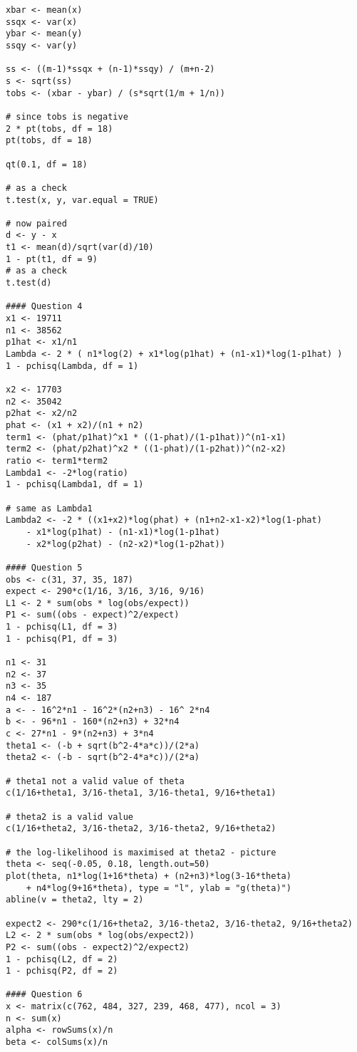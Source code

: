 \documentclass[answers]{exam}
\begin{document}
\begin{questions}
\begin{verbatim}
xbar <- mean(x)
ssqx <- var(x)
ybar <- mean(y)
ssqy <- var(y)

ss <- ((m-1)*ssqx + (n-1)*ssqy) / (m+n-2)
s <- sqrt(ss)
tobs <- (xbar - ybar) / (s*sqrt(1/m + 1/n))

# since tobs is negative
2 * pt(tobs, df = 18)
pt(tobs, df = 18)

qt(0.1, df = 18)

# as a check
t.test(x, y, var.equal = TRUE)

# now paired
d <- y - x
t1 <- mean(d)/sqrt(var(d)/10)
1 - pt(t1, df = 9)
# as a check
t.test(d)

#### Question 4
x1 <- 19711
n1 <- 38562
p1hat <- x1/n1
Lambda <- 2 * ( n1*log(2) + x1*log(p1hat) + (n1-x1)*log(1-p1hat) )
1 - pchisq(Lambda, df = 1)

x2 <- 17703
n2 <- 35042
p2hat <- x2/n2
phat <- (x1 + x2)/(n1 + n2)
term1 <- (phat/p1hat)^x1 * ((1-phat)/(1-p1hat))^(n1-x1)
term2 <- (phat/p2hat)^x2 * ((1-phat)/(1-p2hat))^(n2-x2)
ratio <- term1*term2
Lambda1 <- -2*log(ratio)
1 - pchisq(Lambda1, df = 1)

# same as Lambda1
Lambda2 <- -2 * ((x1+x2)*log(phat) + (n1+n2-x1-x2)*log(1-phat)
    - x1*log(p1hat) - (n1-x1)*log(1-p1hat)
    - x2*log(p2hat) - (n2-x2)*log(1-p2hat))

#### Question 5
obs <- c(31, 37, 35, 187)
expect <- 290*c(1/16, 3/16, 3/16, 9/16)
L1 <- 2 * sum(obs * log(obs/expect))
P1 <- sum((obs - expect)^2/expect)
1 - pchisq(L1, df = 3)
1 - pchisq(P1, df = 3)

n1 <- 31
n2 <- 37
n3 <- 35
n4 <- 187
a <- - 16^2*n1 - 16^2*(n2+n3) - 16^ 2*n4
b <- - 96*n1 - 160*(n2+n3) + 32*n4
c <- 27*n1 - 9*(n2+n3) + 3*n4
theta1 <- (-b + sqrt(b^2-4*a*c))/(2*a)
theta2 <- (-b - sqrt(b^2-4*a*c))/(2*a)

# theta1 not a valid value of theta
c(1/16+theta1, 3/16-theta1, 3/16-theta1, 9/16+theta1)

# theta2 is a valid value
c(1/16+theta2, 3/16-theta2, 3/16-theta2, 9/16+theta2)

# the log-likelihood is maximised at theta2 - picture
theta <- seq(-0.05, 0.18, length.out=50)
plot(theta, n1*log(1+16*theta) + (n2+n3)*log(3-16*theta)
    + n4*log(9+16*theta), type = "l", ylab = "g(theta)")
abline(v = theta2, lty = 2)

expect2 <- 290*c(1/16+theta2, 3/16-theta2, 3/16-theta2, 9/16+theta2)
L2 <- 2 * sum(obs * log(obs/expect2))
P2 <- sum((obs - expect2)^2/expect2)
1 - pchisq(L2, df = 2)
1 - pchisq(P2, df = 2)

#### Question 6
x <- matrix(c(762, 484, 327, 239, 468, 477), ncol = 3)
n <- sum(x)
alpha <- rowSums(x)/n
beta <- colSums(x)/n


\end{verbatim}
\end{questions}
\end{document}

